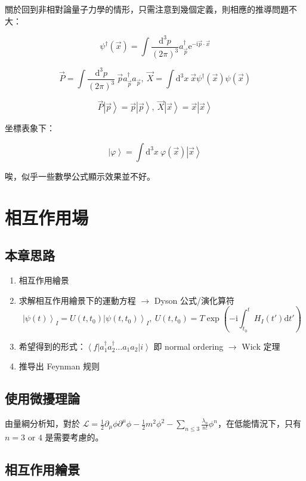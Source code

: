 \documentclass{article}
\begin{document}
關於回到非相對論量子力學的情形，只需注意到幾個定義，則相應的推導問題不大：

$$\psi^{\dagger}(\vec{x})=\int\frac{\mathrm{d}^3p}{(2\pi)^3}a_{\vec{p}}^{\dagger}\mathrm{e}^{-\mathrm{i}\vec{p}\cdot\vec{x}}$$

$$\vec{P}=\int\frac{\mathrm{d}^3p}{(2\pi)^3}\ \vec{p}a_{\vec{p}}^{\dagger}a_{\vec{p}},\ \vec{X}=\int\mathrm{d}^3x\ \vec{x}\psi^{\dagger}(\vec{x})\psi(\vec{x})$$

$$\vec{P}\left|\vec{p}\right\rangle=\vec{p}\left|\vec{p}\right\rangle,\ \vec{X}\left|\vec{x}\right\rangle=\vec{x}\left|\vec{x}\right\rangle$$

坐標表象下：

$$\left|\varphi\right\rangle=\int\mathrm{d}^3x\ \varphi(\vec{x})\left|\vec{x}\right\rangle$$

唉，似乎一些數學公式顯示效果並不好。

\section{相互作用場}

\subsection{本章思路}

\begin{enumerate}
\item 相互作用繪景
\item 求解相互作用繪景下的運動方程 $\rightarrow$ Dyson 公式/演化算符 $$\left|\psi(t)\right\rangle_I=U(t,t_0)\left|\psi(t,t_0)\right\rangle_I,\ U(t,t_0)=T\exp\left(-\mathrm{i}\int^t_{t_0}H_I(t')\mathrm{d}t'\right)$$
\item 希望得到的形式：$\left\langle f\right|a_1^{\dagger}a_2^{\dagger}\dots a_1a_2\left|i\right\rangle$ 即 normal ordering $\rightarrow$ Wick 定理
\item 推导出 Feynman 规则
\end{enumerate}

\subsection{使用微擾理論}

由量綱分析知，對於 $\mathcal{L}=\frac{1}{2}\partial_{\mu}\phi\partial^{\mu}\phi-\frac{1}{2}m^2\phi^2-\sum_{n\leq 3}\frac{\lambda_n}{n!}\phi^n$，在低能情況下，只有 $n=3\text{ or }4$ 是需要考慮的。

\subsection{相互作用繪景}
\end{document}
